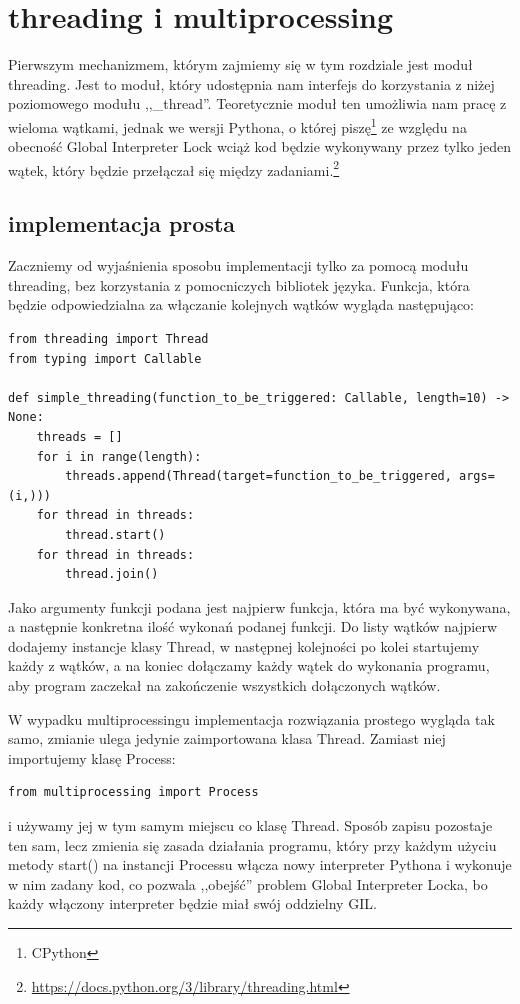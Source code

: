 \section{threading i multiprocessing}
Pierwszym mechanizmem, którym zajmiemy się w tym rozdziale jest moduł threading. Jest to moduł, który udostępnia nam interfejs do korzystania z niżej poziomowego modułu ,,\_thread''. Teoretycznie moduł ten umożliwia nam pracę z wieloma wątkami, jednak we wersji Pythona, o której piszę\footnote{CPython} ze względu na obecność Global Interpreter Lock wciąż kod będzie wykonywany przez tylko jeden wątek, który będzie przełączał się między zadaniami.\footnote{\url{https://docs.python.org/3/library/threading.html}}
\subsection{implementacja prosta}
Zaczniemy od wyjaśnienia sposobu implementacji tylko za pomocą modułu threading, bez korzystania z pomocniczych bibliotek języka. Funkcja, która będzie odpowiedzialna za włączanie kolejnych wątków wygląda następująco:
\begin{lstlisting}
from threading import Thread
from typing import Callable

def simple_threading(function_to_be_triggered: Callable, length=10) -> None:
    threads = []
    for i in range(length):
        threads.append(Thread(target=function_to_be_triggered, args=(i,)))
    for thread in threads:
        thread.start()
    for thread in threads:
        thread.join()
\end{lstlisting}
Jako argumenty funkcji podana jest najpierw funkcja, która ma być wykonywana, a następnie konkretna ilość wykonań podanej funkcji. Do listy wątków najpierw dodajemy instancje klasy Thread, w następnej kolejności po kolei startujemy każdy z wątków, a na koniec dołączamy każdy wątek do wykonania programu, aby program zaczekał na zakończenie wszystkich dołączonych wątków.

W wypadku multiprocessingu implementacja rozwiązania prostego wygląda tak samo, zmianie ulega jedynie zaimportowana klasa Thread. Zamiast niej importujemy klasę Process:
\begin{lstlisting}
from multiprocessing import Process
\end{lstlisting}
i używamy jej w tym samym miejscu co klasę Thread. Sposób zapisu pozostaje ten sam, lecz zmienia się zasada działania programu, który przy każdym użyciu metody start() na instancji Processu włącza nowy interpreter Pythona i wykonuje w nim zadany kod, co pozwala ,,obejść'' problem Global Interpreter Locka, bo każdy włączony interpreter będzie miał swój oddzielny GIL.

